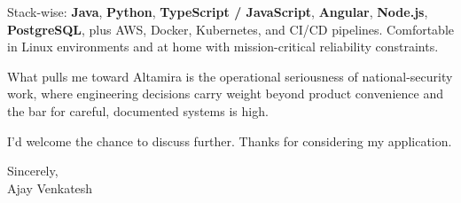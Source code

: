 \documentclass[letterpaper,11pt]{article}
\begin{document}
Stack-wise: \textbf{Java}, \textbf{Python}, \textbf{TypeScript / JavaScript}, \textbf{Angular}, \textbf{Node.js}, \textbf{PostgreSQL}, plus AWS, Docker, Kubernetes, and CI/CD pipelines. Comfortable in Linux environments and at home with mission-critical reliability constraints.

What pulls me toward Altamira is the operational seriousness of national-security work, where engineering decisions carry weight beyond product convenience and the bar for careful, documented systems is high.

I'd welcome the chance to discuss further. Thanks for considering my application.

\vspace{12pt}
Sincerely, \\
Ajay Venkatesh
\end{document}
